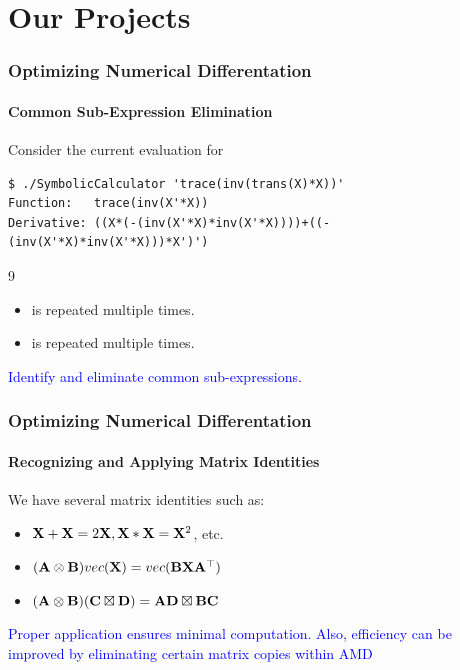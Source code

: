 \section{Our Projects}

\begin{frame}[fragile]
\frametitle{Optimizing Numerical Differentation}
\framesubtitle{Common Sub-Expression Elimination}
%
Consider the current evaluation for 
\textcolor{blue}{}
%
\begin{lstlisting}[style=basic]
$ ./SymbolicCalculator 'trace(inv(trans(X)*X))'
Function:   trace(inv(X'*X))
Derivative: ((X*(-(inv(X'*X)*inv(X'*X))))+((-(inv(X'*X)*inv(X'*X)))*X')')
\end{lstlisting}
9
\begin{itemize}
\item \textcolor{blue}{} is repeated multiple times.
\item \textcolor{blue}{} is repeated multiple times.
\end{itemize}
%
\begin{center}
\textcolor{blue}{Identify and eliminate common sub-expressions.}
\end{center}
%
\end{frame}

\begin{frame}[fragile]
\frametitle{Optimizing Numerical Differentation}
\framesubtitle{Recognizing and Applying Matrix Identities}
%
We have several matrix identities such as:
%
\begin{itemize}
\item $\mathbf{X}+\mathbf{X} = 2\mathbf{X}, \mathbf{X}*\mathbf{X} = \mathbf{X}^2$, etc.
\item $(\mathbf{A}\otimes{}\mathbf{B})vec(\mathbf{X}) = vec(\mathbf{B}\mathbf{X}\mathbf{A}^\top)$
\item $(\mathbf{A}\otimes{}\mathbf{B})(\mathbf{C}\boxtimes{}\mathbf{D}) = \mathbf{A}\mathbf{D}\boxtimes{}\mathbf{B}\mathbf{C}$
\end{itemize}

%
\begin{center}
\textcolor{blue}{Proper application ensures minimal computation.  Also,
efficiency can be improved by eliminating certain matrix copies within AMD}
\end{center}
%
\end{frame}


